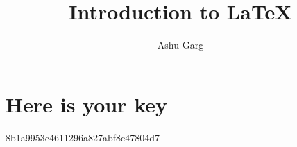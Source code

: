 \documentclass{article}
\begin{document}
\title{Introduction to \LaTeX{}}
\author{Ashu Garg}

\maketitle

\section{Here is your key}
8b1a9953c4611296a827abf8c47804d7
\end{document}
